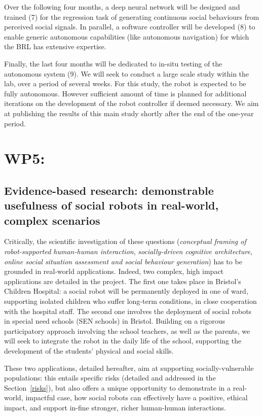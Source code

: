 \documentclass[11pt,a4paper]{report}
\begin{document}
Over the following four months, a deep neural network will be designed
and trained (7) for the regression task of generating continuous social
behaviours from perceived social signals. In parallel, a software
controller will be developed (8) to enable generic autonomous
capabilities (like autonomous navigation) for which the BRL has
extensive expertise.

Finally, the last four months will be dedicated to in-situ testing of
the autonomous system (9). We will seek to conduct a large scale study
within the lab, over a period of several weeks. For this study, the
robot is expected to be fully autonomous. However sufficient amount of
time is planned for additional iterations on the development of the
robot controller if deemed necessary. We aim at publishing the results
of this main study shortly after the end of the one-year period.




\section{WP5: \wpFive{}}


\subsection{Evidence-based research: demonstrable usefulness of social robots in
real-world, complex scenarios}


Critically, the scientific investigation of these questions (\emph{conceptual
framing of robot-supported human-human interaction}, \emph{socially-driven
cognitive architecture},  \emph{online social situation assessment and social
behaviour generation}) has to be
grounded in real-world applications. Indeed, two complex, high impact
applications are detailed in the project. The first one takes place in
Bristol's Children Hospital: a social robot will be permanently deployed in one
of ward, supporting isolated children who suffer long-term conditions, in close
cooperation with the hospital staff. The second one involves the deployment of 
social robots in special need schools (SEN schools) in Bristol. Building on a
rigorous participatory approach involving the school teachers, as well as the
parents, we will seek to integrate the robot in the daily life of the school,
supporting the development of the students' physical and social skills.

These two applications, detailed hereafter, aim at supporting
socially-vulnerable populations: this entails specific risks (detailed and
addressed in the Section~\ref{risks}), but also offers a unique opportunity to
demonstrate in a real-world, impactful case, how social robots can effectively
have a positive, ethical impact, and support in-fine stronger, richer
human-human interactions.
\end{document}
